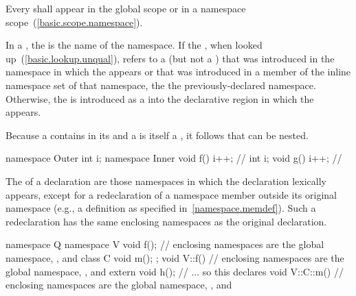 \pnum
Every  shall appear in the global scope
or in a namespace scope~(\ref{basic.scope.namespace}).

\pnum
In a ,
the  is the name of the namespace.
If the , when looked up~(\ref{basic.lookup.unqual}),
refers to a  (but not a )
that was introduced in the namespace
in which the  appears
or that was introduced in a member of the inline namespace set of that namespace,
the 
 the previously-declared namespace.
Otherwise, the  is introduced
as a  into the declarative region
in which the  appears.

\pnum
Because a  contains
 in its  and a
 is itself a , it
follows that  can be nested.
\begin{example}

\begin{codeblock}
namespace Outer {
  int i;
  namespace Inner {
    void f() { i++; }           // 
    int i;
    void g() { i++; }           // 
  }
}
\end{codeblock}
\end{example}

\pnum
The  of a declaration are those
namespaces in which the declaration lexically appears, except for a
redeclaration of a namespace member outside its original namespace
(e.g., a definition as specified in~\ref{namespace.memdef}). Such a
redeclaration has the same enclosing namespaces as the original
declaration.
\begin{example}
\begin{codeblock}
namespace Q {
  namespace V {
    void f();   // enclosing namespaces are the global namespace, , and 
    class C { void m(); };
  }
  void V::f() { // enclosing namespaces are the global namespace, , and 
    extern void h();  // ... so this declares 
  }
  void V::C::m() { // enclosing namespaces are the global namespace, , and 
  }
}
\end{codeblock}
\end{example}


